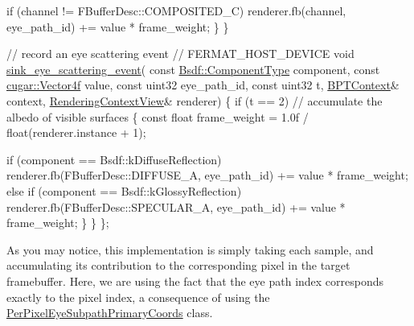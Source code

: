 \begin{DoxyCodeInclude}
                \textcolor{keywordflow}{if} (channel != FBufferDesc::COMPOSITED\_C)
                    renderer.fb(channel, eye\_path\_id) += value * frame\_weight;
            \}
        \}

        \textcolor{comment}{// record an eye scattering event}
        \textcolor{comment}{//}
        FERMAT\_HOST\_DEVICE
        \textcolor{keywordtype}{void} \hyperlink{struct_sample_sink_base_ac96fd485e8196264c43115c68a0bbc25}{sink\_eye\_scattering\_event}(
            \textcolor{keyword}{const} \hyperlink{struct_bsdf_a5f7db6f81220ed9ee6da109d6eb5b585}{Bsdf::ComponentType}    component,
            \textcolor{keyword}{const} \hyperlink{structcugar_1_1_vector}{cugar::Vector4f}        value,
            \textcolor{keyword}{const} uint32                eye\_path\_id,
            \textcolor{keyword}{const} uint32                t,
            \hyperlink{struct_b_p_t_context}{BPTContext}&                   context,
            \hyperlink{struct_rendering_context_view}{RenderingContextView}&       renderer)
        \{
            \textcolor{keywordflow}{if} (t == 2) \textcolor{comment}{// accumulate the albedo of visible surfaces}
            \{
                \textcolor{keyword}{const} \textcolor{keywordtype}{float} frame\_weight = 1.0f / float(renderer.instance + 1);

                \textcolor{keywordflow}{if} (component == Bsdf::kDiffuseReflection)
                    renderer.fb(FBufferDesc::DIFFUSE\_A, eye\_path\_id) += value * frame\_weight;
                \textcolor{keywordflow}{else} \textcolor{keywordflow}{if} (component == Bsdf::kGlossyReflection)
                    renderer.fb(FBufferDesc::SPECULAR\_A, eye\_path\_id) += value * frame\_weight;
            \}
        \}
    \};
\end{DoxyCodeInclude}
 \begin{DoxyParagraph}{}
As you may notice, this implementation is simply taking each sample, and accumulating its contribution to the corresponding pixel in the target framebuffer. Here, we are using the fact that the eye path index corresponds exactly to the pixel index, a consequence of using the \hyperlink{struct_per_pixel_eye_subpath_primary_coords}{Per\+Pixel\+Eye\+Subpath\+Primary\+Coords} class.
\end{DoxyParagraph}
 